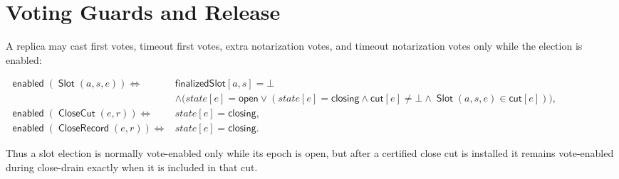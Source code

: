 \documentclass[sigplan,twocolumn,review,anonymous]{acmart}
\newcommand{\func}[1]{\operatorname{\mathsf{#1}}}
\newcommand{\Slot}{\func{Slot}}
\newcommand{\CloseCut}{\func{CloseCut}}
\newcommand{\CloseRecord}{\func{CloseRecord}}
\newcommand{\enabled}{\func{enabled}}
\newcommand{\finalizedSlot}{\mathsf{finalizedSlot}}
\newcommand{\closeCut}{\mathsf{cut}}
\begin{document}
\section{Voting Guards and Release}

A replica may cast first votes, timeout first votes, extra notarization votes, and timeout
notarization votes only while the election is enabled:
\begin{center}
\begin{adjustbox}{max width=\columnwidth}
\(\displaystyle
\begin{aligned}
\enabled(\Slot(a,s,e))\iff{}& \finalizedSlot[a,s]=\bot\\
&\wedge\bigl(state[e]=\mathsf{open}
\vee (state[e]=\mathsf{closing}\wedge\closeCut[e]\neq\bot\wedge\Slot(a,s,e)\in\closeCut[e])\bigr),\\
\enabled(\CloseCut(e,r))\iff{}& state[e]=\mathsf{closing},\\
\enabled(\CloseRecord(e,r))\iff{}& state[e]=\mathsf{closing}.
\end{aligned}
\)
\end{adjustbox}
\end{center}
Thus a slot election is normally vote-enabled only while its epoch is open, but after a certified
close cut is installed it remains vote-enabled during close-drain exactly when it is included in that
cut.
\end{document}
